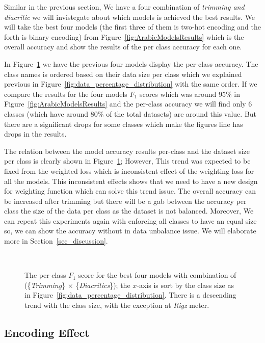 Similar in the previous section, We have a four combination of \textit{trimming and diacritic} we will invistegate about which models is achieved the best results. We will take the best four models (the first three of them is two-hot encoding and the forth is binary encoding) from Figure~\ref{fig:ArabicModelsResults} which is the overall accuracy and show the results of the per class accuracy for each one.

In Figure~\ref{fig:Results_Per_Class} we have the previous four models display the per-class accuracy. The class names is ordered based on their data size per class which we explained previous in Figure~\ref{fig:data_percentage_distribution} with the same order. If we compare the results for the four models $F_1$ scores which was around 95\% in Figure~\ref{fig:ArabicModelsResults} and the per-class accuracy we will find only 6 classes (which have around 80\% of the total datasets) are around this value. But there are a significant drops for some classes which make the figures line has drops in the results.

The relation between the model accuracy results per-class and the dataset size per class is clearly shown in Figure~\ref{fig:Results_Per_Class}; However, This trend was expected to be fixed from the weighted loss which is inconsistent effect of the weighting loss for all the models. This inconsistent effects shows that we need to have a new design for weighting function which can solve this trend issue. The overall accuracy can be increased after trimming but there will be a gab between the accuracy per class the size of the data per class as the dataset is not balanced. Moreover, We can repeat this experiments again with enforcing all classes to have an equal size so, we can show the accuracy without in data unbalance issue. We will elaborate more in Section~\ref{sec_discussion}.



\begin{figure}
 
 \caption{The per-class $F_1$ score for the best four models with combination of (\{\textit{Trimming}\} $\times$ \{\textit{Diacritics}\}); the $x$-axis is sort by the class size as in Figure~\ref{fig:data_percentage_distribution}. There is a descending trend with the class size, with the exception at \textit{Rigz} meter.}~\label{fig:Results_Per_Class}
\end{figure}



\subsection{Encoding Effect}

